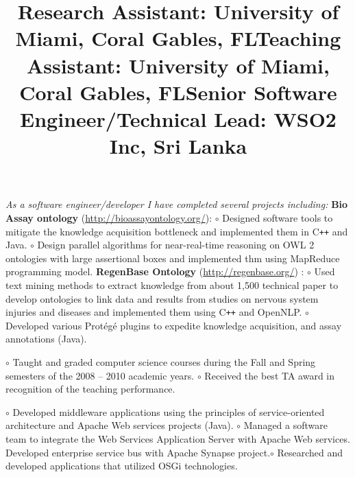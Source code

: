 \begin{resume}
\title{\textbf{Research Assistant: University of Miami, Coral Gables, FL}}


\begin{position}
\textit{As a software engineer/developer I have completed several projects including:}\newline
\textbf{Bio Assay ontology} (\url{http://bioassayontology.org/}): \newline
$\circ$ Designed software tools to mitigate the knowledge acquisition bottleneck and 
implemented them in C\texttt{++} and Java. \newline
$\circ$ Design parallel algorithms for near-real-time reasoning on OWL 2 ontologies with large 
assertional boxes and implemented thm using MapReduce programming model. \newline
\textbf{RegenBase Ontology} (\url{http://regenbase.org/}) : \newline 
$\circ$ Used text mining methods to extract knowledge from about 1,500 technical paper to develop 
ontologies to link data 
and results from studies on nervous system injuries and diseases and implemented 
them using C\texttt{++} and 
OpenNLP. \newline $\circ$ Developed  various Prot\'{e}g\'{e} plugins to 
expedite knowledge acquisition, and assay annotations (Java).


\end{position}

\title{\textbf{Teaching Assistant: University of Miami, Coral Gables, FL}}
\begin{position}
$\circ$  Taught and graded computer science courses during the Fall and Spring
semesters of the 2008 -- 2010 academic years. \newline $\circ$   Received the best TA award in 
recognition of the teaching
performance.
\end{position}

\title{\textbf{Senior Software Engineer/Technical Lead: WSO2 Inc, Sri Lanka}}
\begin{position}
$\circ$ Developed middleware applications using the principles of service-oriented 
architecture and Apache Web services projects (Java).   \newline $\circ$ 
Managed a software team to integrate the Web Services Application Server with Apache Web services. 
Developed enterprise service bus with Apache Synapse project.\newline $\circ$ Researched and 
developed 
applications that utilized OSGi technologies. 
\end{position}


\end{resume}
